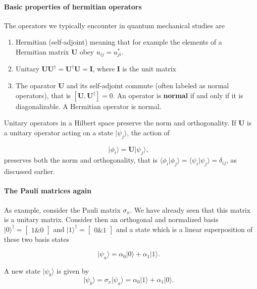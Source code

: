 \paragraph{Basic properties of hermitian operators}

The operators we typically encounter in quantum mechanical studies are
\begin{enumerate}
\item Hermitian (self-adjoint) meaning that for example the elements of a Hermitian matrix $\bm{U}$ obey $u_{ij}=u_{ji}^*$.

\item Unitary $\bm{U}\bm{U}^{\dagger}=\bm{U}^{\dagger}\bm{U}=\bm{I}$, where $\bm{I}$ is the unit matrix

\item The oparator $\bm{U}$ and its self-adjoint commute (often labeled as normal operators), that is  $[\bm{U},\bm{U}^{\dagger}]=0$. An operator is \textbf{normal} if and only if it is diagonalizable. A Hermitian operator is normal.
\end{enumerate}


Unitary operators in a Hilbert space preserve the norm and orthogonality. If $\bm{U}$ is a unitary operator acting on a state $\vert \psi_j\rangle$, the action of

\[
\vert \phi_i\rangle=\bm{U}\vert \psi_j\rangle,
\]
preserves both the norm and orthogonality, that is $\langle \phi_i \vert \phi_j\rangle=\langle \psi_i \vert \psi_j\rangle=\delta_{ij}$, as discussed earlier.


\paragraph{The Pauli matrices again}

As example, consider the Pauli matrix $\sigma_x$. We have already seen that this matrix is a unitary matrix. Consider then an orthogonal and normalized basis $\vert 0\rangle^{\dagger} =\begin{bmatrix} 1 {\&} 0\end{bmatrix}$ and $\vert 1\rangle^{\dagger} =\begin{bmatrix} 0 {\&} 1\end{bmatrix}$ and a state which is a linear superposition of these two basis states

\[
\vert \psi_a\rangle=\alpha_0\vert 0\rangle +\alpha_1\vert 1\rangle.
\]

A new state $\vert \psi_b\rangle$ is given by
\[
\vert \psi_b\rangle=\sigma_x\vert \psi_a\rangle=\alpha_0\vert 1\rangle +\alpha_1\vert 0\rangle.
\]


